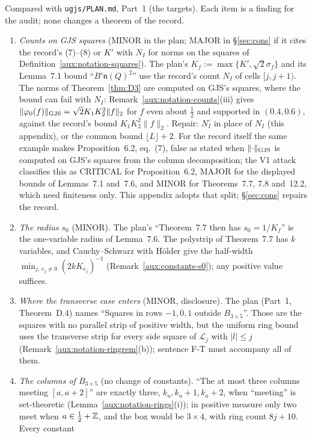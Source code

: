 Compared with \texttt{ugjs/PLAN.md}, Part~1 (the targets).  Each item is a finding for the
audit; none changes a theorem of the record.
\begin{enumerate}
\item[(D1)] \emph{Counts on GJS squares} (MINOR in the plan; MAJOR in \S\ref{sec:cons} if it
cites the record's (7)--(8) or $K'$ with $N_I$ for norms on the squares of
Definition~\ref{aux:notation-squares}).  The plan's $K_f:=\max\{K',\sqrt2\sigma_f\}$ and its
Lemma~7.1 bound ``$B'\mathfrak n(Q)^2$'' use the record's count $N_I$ of cells $[j,j+1)$.  The
norms of Theorem~\ref{thm:D3} are computed on GJS's squares, where the bound can fail with
$N_I$: Remark~\ref{aux:notation-counts}(iii) gives $\lVert \varphi_0(f)\rVert_{\mathrm{GJS}}=\sqrt2K_1K_2^2\|f\|_2$ for
$f$ even about $\frac12$ and supported in $(0.4,0.6)$, against the record's bound
$K_1K_2^2\|f\|_2$.  Repair: $N^{\square}_I$ in place of $N_I$ (this appendix), or the common bound
$\lfloor L\rfloor+2$.  For the record itself the same example makes Proposition~6.2, eq.~(7),
false as stated when $\lVert \cdot\rVert_{\mathrm{GJS}}$ is computed on GJS's squares from the column decomposition; the
V1 attack classifies this as CRITICAL for Proposition~6.2, MAJOR for the displayed bounds of
Lemmas~7.1 and~7.6, and MINOR for Theorems~7.7, 7.8 and~12.2, which need finiteness only.  This
appendix adopts that split; \S\ref{sec:cons} repairs the record.
\item[(D2)] \emph{The radius $s_0$} (MINOR).  The plan's ``Theorem~7.7 then has $s_0=1/K_f$'' is
the one-variable radius of Lemma~7.6.  The polystrip of Theorem~7.7 has $k$ variables, and
Cauchy--Schwarz with H\"older give the half-width $\min_{j,\,e_j\ne0}(2kK_{e_j})^{-1}$
(Remark~\ref{aux:constants-s0}); any positive value suffices.
\item[(D3)] \emph{Where the transverse case enters} (MINOR, disclosure).  The plan (Part~1,
Theorem~D.4) names ``Squares in rows $-1,0,1$ outside $B_{3\times5}$''.  Those are the squares with
no parallel strip of positive width, but the uniform ring bound uses the transverse strip for
every side square of $\mathcal L_j$ with $|l|\le j$ (Remark~\ref{aux:notation-ringrem}(b));
sentence F-T must accompany all of them.
\item[(D4)] \emph{The columns of $B_{3\times5}$} (no change of constants).  ``The at most three
columns meeting $[a,a+2]$'' are exactly three, $k_a,k_a+1,k_a+2$, when ``meeting'' is
set-theoretic (Lemma~\ref{aux:notation-rings}(i)); in positive measure only two meet when
$a\in\frac12+\mathbb{Z}$, and the box would be $3\times4$, with ring count $8j+10$.  Every constant

\end{enumerate}
